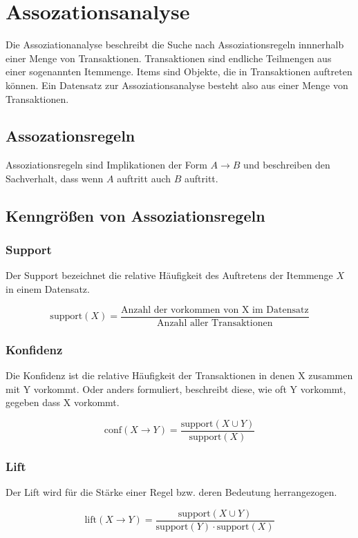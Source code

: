 \section{Assozationsanalyse}\cite{Agrawal:1993:MAR:170035.170072}%
Die Assoziationanalyse beschreibt die Suche nach Assoziationsregeln innnerhalb einer Menge von Transaktionen. Transaktionen sind endliche Teilmengen aus einer sogenannten Itemmenge. Items sind Objekte, die in Transaktionen auftreten können. Ein Datensatz zur Assoziationsanalyse besteht also aus einer Menge von Transaktionen.
\subsection{Assozationsregeln}
Assoziationsregeln sind Implikationen der Form $A \rightarrow B$ und beschreiben den Sachverhalt, dass wenn $A$ auftritt auch $B$ auftritt.
\subsection{Kenngrößen von Assoziationsregeln}
\subsubsection{Support}
Der Support bezeichnet die relative Häufigkeit des Auftretens der Itemmenge $X$ in einem Datensatz.
\begin{mdef}[Support]
\[
\mathrm{support}(X) = \frac{\text{Anzahl der vorkommen von X im Datensatz}}{\text{Anzahl aller Transaktionen}}
\]
\end{mdef}
\subsubsection{Konfidenz}
Die Konfidenz ist die relative Häufigkeit der Transaktionen in denen X zusammen mit Y vorkommt. Oder anders formuliert, beschreibt diese, wie oft Y vorkommt, gegeben dass X vorkommt.
\begin{mdef}[Konfidenz]
\[
\mathrm{conf}(X\rightarrow Y) = \frac{\mathrm{support}(X \cup Y)}{\mathrm{support}(X)}
\]
\end{mdef}
\subsubsection{Lift}
Der Lift wird für die Stärke einer Regel bzw. deren Bedeutung herrangezogen.
\begin{mdef}[Lift]
\[
\mathrm{lift}(X\rightarrow Y) = \frac{ \mathrm{support}(X \cup Y)}{ \mathrm{support}(Y) \cdot \mathrm{support}(X) }
\]
\end{mdef}
